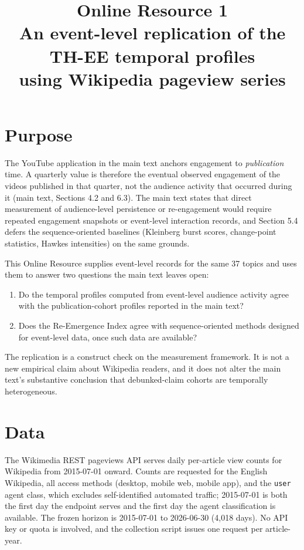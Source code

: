 \documentclass[11pt]{article}
\title{Online Resource 1\\
\large An event-level replication of the TH-EE temporal profiles\\
using Wikipedia pageview series}
\date{}
\begin{document}
\maketitle

\section{Purpose}
\label{sec:or1_purpose}

The YouTube application in the main text anchors engagement to \emph{publication}
time. A quarterly value is therefore the eventual observed engagement of the
videos published in that quarter, not the audience activity that occurred during
it (main text, Sections 4.2 and 6.3). The main text states that direct
measurement of audience-level persistence or re-engagement would require
repeated engagement snapshots or event-level interaction records, and Section
5.4 defers the sequence-oriented baselines (Kleinberg burst scores, change-point
statistics, Hawkes intensities) on the same grounds.

This Online Resource supplies event-level records for the same 37 topics and
uses them to answer two questions the main text leaves open:

\begin{enumerate}
\item[\textbf{OR1.}] Do the temporal profiles computed from event-level audience
      activity agree with the publication-cohort profiles reported in the main
      text?
\item[\textbf{OR2.}] Does the Re-Emergence Index agree with sequence-oriented
      methods designed for event-level data, once such data are available?
\end{enumerate}

The replication is a construct check on the measurement framework. It is not a
new empirical claim about Wikipedia readers, and it does not alter the main
text's substantive conclusion that debunked-claim cohorts are temporally
heterogeneous.

\section{Data}
\label{sec:or1_data}

The Wikimedia REST pageviews API serves daily per-article view counts for
Wikipedia from 2015-07-01 onward. Counts are requested for the English
Wikipedia, all access methods (desktop, mobile web, mobile app), and the
\texttt{user} agent class, which excludes self-identified automated traffic;
2015-07-01 is both the first day the endpoint serves and the first day the agent
classification is available. The frozen horizon is 2015-07-01 to 2026-06-30
(4{,}018 days). No API key or quota is involved, and the collection script issues
one request per article-year.
\end{document}
